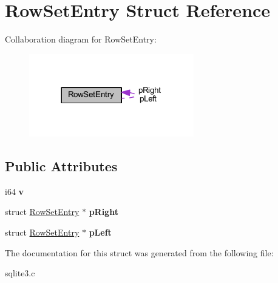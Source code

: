\hypertarget{struct_row_set_entry}{\section{Row\-Set\-Entry Struct Reference}
\label{struct_row_set_entry}
}


Collaboration diagram for Row\-Set\-Entry\-:\nopagebreak
\begin{figure}[H]
\begin{center}
\leavevmode
\includegraphics[width=203pt]{struct_row_set_entry__coll__graph}
\end{center}
\end{figure}
\subsection*{Public Attributes}
\begin{DoxyCompactItemize}
\item 
\hypertarget{struct_row_set_entry_ac72670935246f1bff5e4d96703574071}{i64 {\bfseries v}}\label{struct_row_set_entry_ac72670935246f1bff5e4d96703574071}

\item 
\hypertarget{struct_row_set_entry_ac39c09525dd24f42af522587d1bc5026}{struct \hyperlink{struct_row_set_entry}{Row\-Set\-Entry} $\ast$ {\bfseries p\-Right}}\label{struct_row_set_entry_ac39c09525dd24f42af522587d1bc5026}

\item 
\hypertarget{struct_row_set_entry_a59365203c30ce782ae38e534c90db14b}{struct \hyperlink{struct_row_set_entry}{Row\-Set\-Entry} $\ast$ {\bfseries p\-Left}}\label{struct_row_set_entry_a59365203c30ce782ae38e534c90db14b}

\end{DoxyCompactItemize}


The documentation for this struct was generated from the following file\-:\begin{DoxyCompactItemize}
\item 
sqlite3.\-c\end{DoxyCompactItemize}
